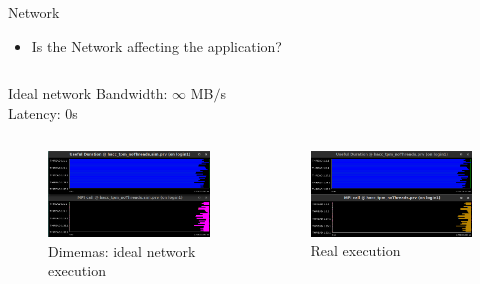 \documentclass[aspectratio=169]{bredelebeamer}
\begin{document}
\begin{frame}{Network}

\begin{itemize}
\item  Is the Network affecting the application?\\
\end{itemize}

\begin{columns}

\begin{block}{Ideal network}
Bandwidth: $\infty$ MB$/$s \\
Latency: 0s \\
\end{block}
\end{columns}

\vspace{0.2cm}
\begin{columns}

\begin{figure}[h!]
  \centering
\includegraphics[width=6cm, keepaspectratio=1]{"./img/one_step/dimemas/dimemas_4x2x2"}
\caption*{Dimemas: ideal network execution}
\end{figure}



\begin{figure}[h!]
  \centering
\includegraphics[width=6cm, keepaspectratio=1]{"./img/one_step/dimemas/against_dimemas_4x2x2"}
\caption*{Real execution}
\end{figure}

\end{columns}
\end{frame}
\end{document}

